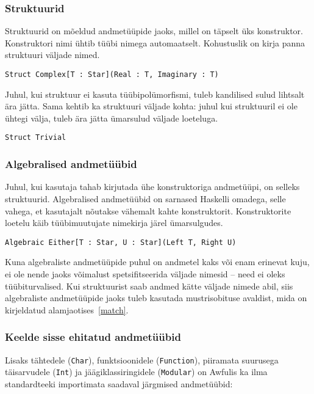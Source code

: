 \documentclass[12pt]{article}
\begin{document}
      \subsubsection{Struktuurid}
        Struktuurid on mõeldud andmetüüpide jaoks, millel on täpselt üks konstruktor. Konstruktori nimi ühtib tüübi nimega automaatselt. Kohustuslik on kirja panna struktuuri väljade nimed.

        \begin{verbatim}Struct Complex[T : Star](Real : T, Imaginary : T)\end{verbatim}

        Juhul, kui struktuur ei kasuta tüübipolümorfismi, tuleb kandilised sulud lihtsalt ära jätta. Sama kehtib ka struktuuri väljade kohta: juhul kui struktuuril ei ole ühtegi välja, tuleb ära jätta ümarsulud väljade loeteluga.

        \begin{verbatim}Struct Trivial\end{verbatim}

      \subsubsection{Algebralised andmetüübid}
        Juhul, kui kasutaja tahab kirjutada ühe konstruktoriga andmetüüpi, on selleks struktuurid. Algebralised andmetüübid on sarnased Haskelli omadega, selle vahega, et kasutajalt nõutakse vähemalt kahte konstruktorit. Konstruktorite loetelu käib tüübimuutujate nimekirja järel ümarsulgudes.

        \begin{verbatim}Algebraic Either[T : Star, U : Star](Left T, Right U)\end{verbatim}

        Kuna algebraliste andmetüüpide puhul on andmetel kaks või enam erinevat kuju, ei ole nende jaoks võimalust spetsifitseerida väljade nimesid -- need ei oleks tüübiturvalised. Kui struktuurist saab andmed kätte väljade nimede abil, siis algebraliste andmetüüpide jaoks tuleb kasutada mustrisobituse avaldist, mida on kirjeldatud alamjaotises~\ref{match}.
      \subsubsection{Keelde sisse ehitatud andmetüübid}
        Lisaks tähtedele (\verb!Char!), funktsioonidele (\verb!Function!), piiramata suurusega täisarvudele (\verb!Int!) ja jäägiklassiringidele (\verb!Modular!) on Awfulis ka ilma standardteeki importimata saadaval järgmised andmetüübid:
\end{document}
